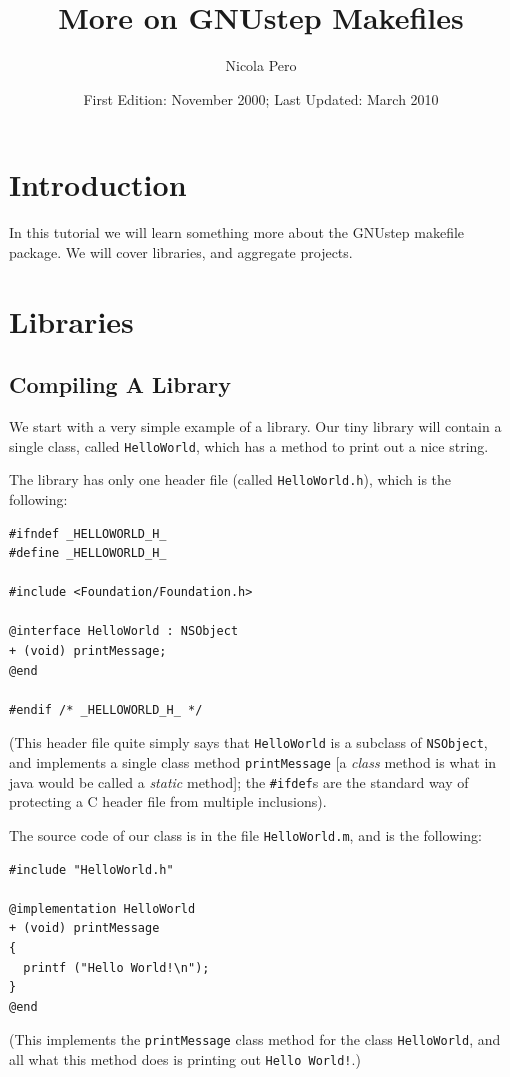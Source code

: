 \documentclass[a4paper]{article}
\begin{document}
\author{Nicola Pero}
\title{More on GNUstep Makefiles}
\date{First Edition: November 2000; Last Updated: March 2010}
\maketitle

\section{Introduction}
In this tutorial we will learn something more about the GNUstep
makefile package.  We will cover libraries, and aggregate projects.

\section{Libraries}

\subsection{Compiling A Library}
We start with a very simple example of a library.  Our tiny 
library will contain a single class, called \texttt{HelloWorld}, 
which has a method to print out a nice string.

The library has only one header file (called \texttt{HelloWorld.h}),
which is the following:
\begin{verbatim}
#ifndef _HELLOWORLD_H_
#define _HELLOWORLD_H_

#include <Foundation/Foundation.h>

@interface HelloWorld : NSObject
+ (void) printMessage;
@end

#endif /* _HELLOWORLD_H_ */
\end{verbatim}
(This header file quite simply says that \texttt{HelloWorld} is a
subclass of \texttt{NSObject}, and implements a single class method
\texttt{printMessage} [a {\sl class} method is what in java would be
called a {\sl static} method]; the \texttt{\#ifdef}s are the
standard way of protecting a C header file from multiple inclusions).

The source code of our class is in the file \texttt{HelloWorld.m}, and
is the following:
\begin{verbatim}
#include "HelloWorld.h"

@implementation HelloWorld
+ (void) printMessage 
{
  printf ("Hello World!\n");
} 
@end
\end{verbatim}
(This implements the \texttt{printMessage} class method for the class
\texttt{HelloWorld}, and all what this method does is printing out
\texttt{Hello World!}.)
\end{document}
